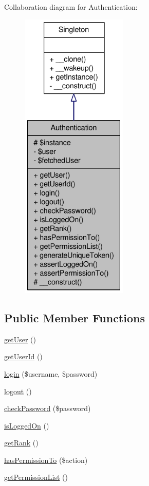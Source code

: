 Collaboration diagram for Authentication:\nopagebreak
\begin{figure}[H]
\begin{center}
\leavevmode
\includegraphics[height=400pt]{classAuthentication__coll__graph}
\end{center}
\end{figure}
\subsection*{Public Member Functions}
\begin{DoxyCompactItemize}
\item 
\hyperlink{classAuthentication_a3da927c6d0643db0d0048b5c21a92f93}{getUser} ()
\item 
\hyperlink{classAuthentication_aca16ed99ec2ce7b7a0213a4c718af004}{getUserId} ()
\item 
\hyperlink{classAuthentication_a505c6a692893f694cc2d63a102a03338}{login} (\$username, \$password)
\item 
\hyperlink{classAuthentication_a478caa2b82260f22462a243fdbabad2f}{logout} ()
\item 
\hyperlink{classAuthentication_a317b36d37a99df0476dd0ec55f52bf9d}{checkPassword} (\$password)
\item 
\hyperlink{classAuthentication_ad311beb355ff37fd815c0141cc7727f3}{isLoggedOn} ()
\item 
\hyperlink{classAuthentication_a06867283805ffd4e223167cc15bbd800}{getRank} ()
\item 
\hyperlink{classAuthentication_ad5d1fba33f4df315084335f57025eec6}{hasPermissionTo} (\$action)
\item 
\hyperlink{classAuthentication_a5e0187c1c057694e6dae84006a6944c7}{getPermissionList} ()
\end{DoxyCompactItemize}
